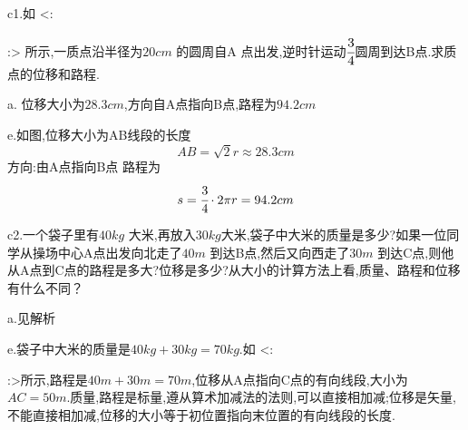   \begin{calculate}
   c1.如
   <:
   :>
   所示,一质点沿半径为$20cm$ 的圆周自A 点出发,逆时针运动$\cfrac{3}{4}$圆周到达B点.求质点的位移和路程.

a. 位移大小为$28.3cm$,方向自A点指向B点,路程为$94.2cm$

e.如图,位移大小为AB线段的长度
$$AB=\sqrt{2}r\approx28.3cm$$
方向:由A点指向B点
\newline
路程为
$$s=\cfrac{3}{4}\cdot2\pi r=94.2cm$$

c2.一个袋子里有$40kg$ 大米,再放入$30kg$大米,袋子中大米的质量是多少?如果一位同学从操场中心A点出发向北走了$40m$ 到达B点,然后又向西走了$30m$ 到达C点,则他从A点到C点的路程是多大?位移是多少?从大小的计算方法上看,质量、路程和位移有什么不同？

a.见解析

e.袋子中大米的质量是$40kg+30kg=70kg$.如
<:
:>所示,路程是$40m+30m=70m$,位移从A点指向C点的有向线段,大小为$AC=50m$.质量,路程是标量,遵从算术加减法的法则,可以直接相加减;位移是矢量,不能直接相加减,位移的大小等于初位置指向末位置的有向线段的长度.

  \end{calculate}

